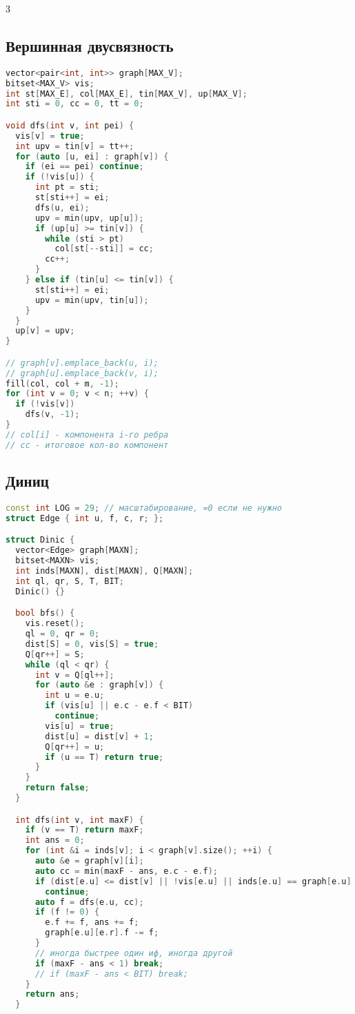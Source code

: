 \documentclass[9pt,a4paper,landscape,twosided]{extarticle}
\begin{document}
\begin{multicols*}{3}
\subsection{Вершинная двусвязность}
\begin{lstlisting}[language=C++]
vector<pair<int, int>> graph[MAX_V];
bitset<MAX_V> vis;
int st[MAX_E], col[MAX_E], tin[MAX_V], up[MAX_V];
int sti = 0, cc = 0, tt = 0;

void dfs(int v, int pei) {
  vis[v] = true;
  int upv = tin[v] = tt++;
  for (auto [u, ei] : graph[v]) {
    if (ei == pei) continue;
    if (!vis[u]) {
      int pt = sti;
      st[sti++] = ei;
      dfs(u, ei);
      upv = min(upv, up[u]);
      if (up[u] >= tin[v]) {
        while (sti > pt)
          col[st[--sti]] = cc;
        cc++;
      }
    } else if (tin[u] <= tin[v]) {
      st[sti++] = ei;
      upv = min(upv, tin[u]);
    }
  }
  up[v] = upv;
}

// graph[v].emplace_back(u, i);
// graph[u].emplace_back(v, i);
fill(col, col + m, -1);
for (int v = 0; v < n; ++v) {
  if (!vis[v])
    dfs(v, -1);
}
// col[i] - компонента i-го ребра
// cc - итоговое кол-во компонент
\end{lstlisting}

\subsection{Диниц}
\begin{lstlisting}[language=C++]
const int LOG = 29; // масштабирование, =0 если не нужно
struct Edge { int u, f, c, r; };

struct Dinic {
  vector<Edge> graph[MAXN];
  bitset<MAXN> vis;
  int inds[MAXN], dist[MAXN], Q[MAXN];
  int ql, qr, S, T, BIT;
  Dinic() {}

  bool bfs() {
    vis.reset();
    ql = 0, qr = 0;
    dist[S] = 0, vis[S] = true;
    Q[qr++] = S;
    while (ql < qr) {
      int v = Q[ql++];
      for (auto &e : graph[v]) {
        int u = e.u;
        if (vis[u] || e.c - e.f < BIT)
          continue;
        vis[u] = true;
        dist[u] = dist[v] + 1;
        Q[qr++] = u;
        if (u == T) return true;
      }
    }
    return false;
  }

  int dfs(int v, int maxF) {
    if (v == T) return maxF;
    int ans = 0;
    for (int &i = inds[v]; i < graph[v].size(); ++i) {
      auto &e = graph[v][i];
      auto cc = min(maxF - ans, e.c - e.f);
      if (dist[e.u] <= dist[v] || !vis[e.u] || inds[e.u] == graph[e.u].size() || cc < BIT)
        continue;
      auto f = dfs(e.u, cc);
      if (f != 0) {
        e.f += f, ans += f;
        graph[e.u][e.r].f -= f;
      }
      // иногда быстрее один иф, иногда другой
      if (maxF - ans < 1) break;
      // if (maxF - ans < BIT) break;
    }
    return ans;
  }


\end{lstlisting}
\end{multicols*}
\end{document}
